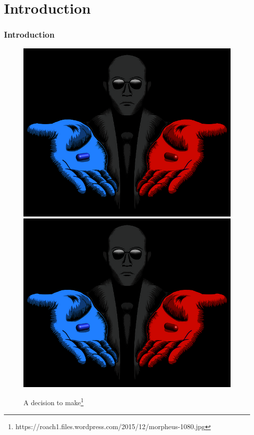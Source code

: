 \section*{Introduction}
\begin{frame}[fragile]
    \frametitle{Introduction}
    \begin{figure}
        \begin{center}
            {
                \includegraphics[height=0.70\textheight,keepaspectratio]{./images/Decision.jpg}
            }
            {
                \includegraphics[height=0.67\textheight,keepaspectratio]{./images/Decision.jpg}
            }
            \caption{A decision to make\footnote{https://roach1.files.wordpress.com/2015/12/morpheus-1080.jpg}}
        \end{center}
    \end{figure}
\end{frame}

